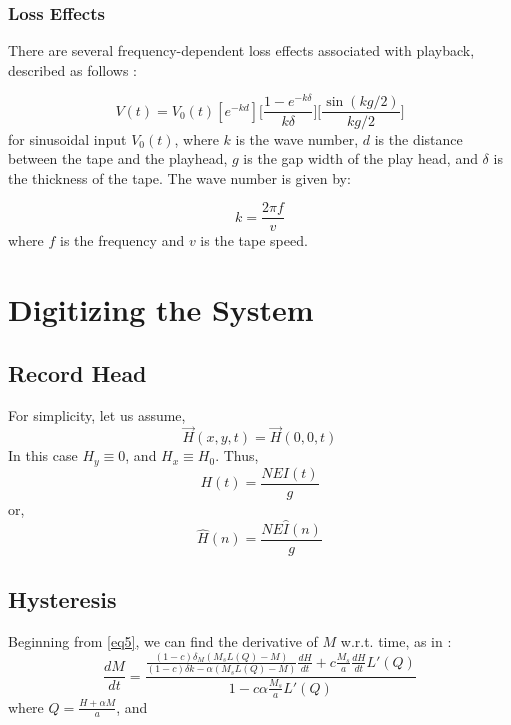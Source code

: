 \documentclass[twoside,a4paper]{article}
\begin{document}
\subsubsection{Loss Effects}
There are several frequency-dependent loss effects associated with playback,
described as follows \cite{Kadis}:

\begin{equation}
    V(t) = V_0(t) [e^{-kd}] \Big[\frac{1 - e^{-k \delta}}{k \delta} \Big] \Big[\frac{\sin (kg /2)}{kg/2} \Big]
    \label{eq:lossEffects}
\end{equation}
%
for sinusoidal input $V_0(t)$, where $k$ is the wave number, $d$ is the distance between the tape and the playhead,
$g$ is the gap width of the play head, and $\delta$ is the thickness of the tape. The wave number
is given by:

\begin{equation}
    k = \frac {2 \pi f}{v}
    \label{eq:wavenumber}
\end{equation}
%
where $f$ is the frequency and $v$ is the tape speed.

\section{Digitizing the System}
\subsection{Record Head}
For simplicity, let us assume,
\begin{equation}
    \vec{H}(x,y,t) = \vec{H}(0,0,t)
\end{equation}
%
In this case $H_y \equiv 0$, and $H_x \equiv H_0$. Thus,
\begin{equation}
    H(t) = \frac{NEI(t)}{g}
    \label{eq15}
\end{equation}
%
or,
\begin{equation}
    \hat{H}(n) = \frac{NE\hat{I}(n)}{g}
    \label{eq:Hin}
\end{equation}

\subsection{Hysteresis}
Beginning from \cref{eq5}, we can find the derivative of $M$ w.r.t. time,
as in \cite{Hysteresis}:
\begin{equation}
    \frac{dM}{dt} = \frac{\frac{(1-c) \delta_M (M_sL(Q) - M)}{(1-c) \delta k - \alpha (M_sL(Q) - M)} \frac{dH}{dt} + c \frac{M_s}{a} \frac{dH}{dt} L'(Q)}{1 - c \alpha \frac{M_s}{a} L'(Q)}
    \label{eq:dmdt}
\end{equation}
%
where $Q = \frac{H + \alpha M}{a}$, and
\end{document}
